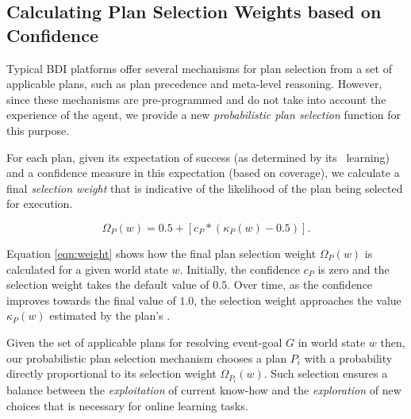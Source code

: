 \subsection{Calculating Plan Selection Weights based on Confidence}


Typical BDI platforms offer several mechanisms for plan selection from a set of applicable plans, such as plan precedence and meta-level reasoning. However, since these mechanisms are pre-programmed and do not take into account the experience of the agent, we provide a new \textit{probabilistic plan selection} function for this purpose. 

For each plan, given its expectation of success (as determined by its \dt\ learning) and a confidence measure in this expectation (based on coverage), we calculate a final \textit{selection weight} that is indicative of the likelihood of the plan being selected for execution.

\begin{equation*}\label{eqn:weight}   
\Omega_P(w) = 0.5 + \left[  c_P *  \left( \kappa_P(w) - 0.5 \right)  \right].
\end{equation*}

Equation \ref{eqn:weight} shows how the final plan selection weight $\Omega_P(w)$ is calculated for a given world state $w$. Initially, the confidence $c_P$ is zero and the selection weight takes the default value of $0.5$. Over time, as the confidence improves towards the final value of $1.0$, the selection weight approaches the value $\kappa_P(w)$ estimated by the plan's \dt.

Given the set of applicable plans for resolving event-goal $G$ in world state $w$ then, our probabilistic plan selection mechanism chooses a plan $P_i$ with a probability directly proportional to its selection weight $\Omega_{P_i}(w)$. Such selection ensures a balance between the \emph{exploitation} of current know-how and the \textit{exploration} of new choices that is necessary for online learning tasks. 




